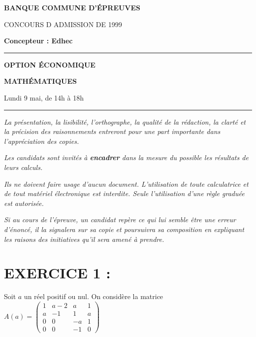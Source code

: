 \documentclass[11pt]{article}%
\begin{document}

\begin{center}
{\LARG\E\textbf{BANQUE COMMUNE D'ÉPREUVES}}



{\large \textsc{CONCOURS D ADMISSION DE 1999}}



{\large \textbf{Concepteur : Edhec}}



\rule{2.39cm}{0.05cm}



{\Large \textbf{OPTION ÉCONOMIQUE}}



{\Large \textbf{MATHÉMATIQUES }}



{\Large Lundi 9 mai, de 14h à 18h}



\rule{2.39cm}{0.05cm}
\end{center}

\textit{La présentation, la lisibilité, l'orthographe, la qualité
de la rédaction, la clarté et la précision des raisonnements
entreront pour une part importante dans l'appréciation des copies.}

\textit{Les candidats sont invités à \textbf{encadrer} dans la mesure
du possible les résultats de leurs calculs.}

\textit{Ils ne doivent faire usage d'aucun document. L'utilisation de
toute
calculatrice et de tout matériel électronique est interdite. Seule
l'utilisation d'une règle graduée est autorisée.}

\textit{Si au cours de l'épreuve, un candidat repère ce qui lui semble
être une erreur d'énoncé, il la signalera sur sa copie et
poursuivra sa composition en expliquant les raisons des initiatives
qu'il sera
amené à prendre.}

\vspace*{3cm}

\section*{EXERCICE 1 :}

Soit $a$ un réel positif ou nul. On considère la matrice $A\left(
a\right) = \left( 
\begin{array}{cccc}
1 & a-2 & a & 1 \\
a & -1 & 1 & a \\
0 & 0 & -a & 1 \\
0 & 0 & -1 & 0
\end{array}
\right) $
\end{document}
